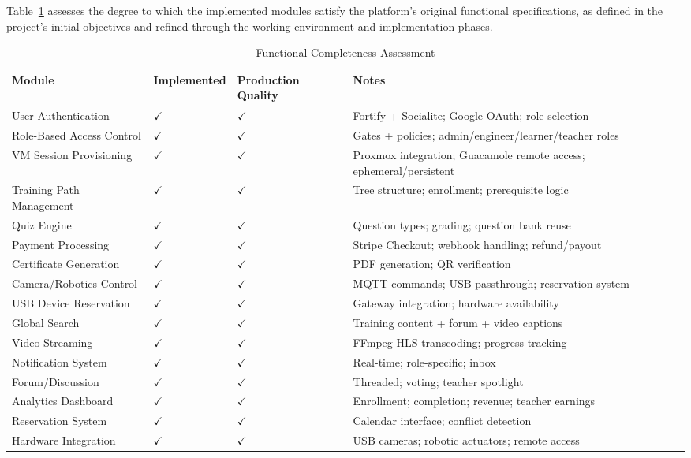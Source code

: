 Table~\ref{tab:functional-completeness} assesses the degree to which the implemented modules satisfy the platform's original functional specifications, as defined in the project's initial objectives and refined through the working environment and implementation phases.

\begin{table}[H]
\centering
\caption{Functional Completeness Assessment}
\label{tab:functional-completeness}
\begin{tabular}{|p{4cm}|p{3cm}|p{3cm}|p{4.5cm}|}
\hline
\textbf{Module} & \textbf{Implemented} & \textbf{Production Quality} & \textbf{Notes} \\
\hline
User Authentication & $\checkmark$ & $\checkmark$ & Fortify + Socialite; Google OAuth; role selection \\
\hline
Role-Based Access Control & $\checkmark$ & $\checkmark$ & Gates + policies; admin/engineer/learner/teacher roles \\
\hline
VM Session Provisioning & $\checkmark$ & $\checkmark$ & Proxmox integration; Guacamole remote access; ephemeral/persistent \\
\hline
Training Path Management & $\checkmark$ & $\checkmark$ & Tree structure; enrollment; prerequisite logic \\
\hline
Quiz Engine & $\checkmark$ & $\checkmark$ & Question types; grading; question bank reuse \\
\hline
Payment Processing & $\checkmark$ & $\checkmark$ & Stripe Checkout; webhook handling; refund/payout \\
\hline
Certificate Generation & $\checkmark$ & $\checkmark$ & PDF generation; QR verification \\
\hline
Camera/Robotics Control & $\checkmark$ & $\checkmark$ & MQTT commands; USB passthrough; reservation system \\
\hline
USB Device Reservation & $\checkmark$ & $\checkmark$ & Gateway integration; hardware availability \\
\hline
Global Search & $\checkmark$ & $\checkmark$ & Training content + forum + video captions \\
\hline
Video Streaming & $\checkmark$ & $\checkmark$ & FFmpeg HLS transcoding; progress tracking \\
\hline
Notification System & $\checkmark$ & $\checkmark$ & Real-time; role-specific; inbox \\
\hline
Forum/Discussion & $\checkmark$ & $\checkmark$ & Threaded; voting; teacher spotlight \\
\hline
Analytics Dashboard & $\checkmark$ & $\checkmark$ & Enrollment; completion; revenue; teacher earnings \\
\hline
Reservation System & $\checkmark$ & $\checkmark$ & Calendar interface; conflict detection \\
\hline
Hardware Integration & $\checkmark$ & $\checkmark$ & USB cameras; robotic actuators; remote access \\
\hline
\end{tabular}
\end{table}

